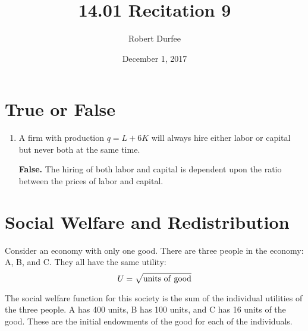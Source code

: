 \documentclass{article}
\title{ 14.01 Recitation 9 }
\author{ Robert Durfee }
\date{ December 1, 2017 }
\begin{document}
\maketitle

\section{ True or False }

\begin{enumerate}[1.]
    \item A firm with production $q = L + 6K$ will always hire either labor or
        capital but never both at the same time.

        \textbf{False.} The hiring of both labor and capital is dependent upon
        the ratio between the prices of labor and capital.
\end{enumerate}

\section{ Social Welfare and Redistribution }

Consider an economy with only one good. There are three people in the economy:
A, B, and C. They all have the same utility:
$$ U = \sqrt{ \rm{ units\ of\ good } } $$

The social welfare function for this society is the sum of the individual
utilities of the three people. A has 400 units, B has 100 units, and C has 16
units of the good. These are the initial endowments of the good for each of the
individuals.
\end{document}
